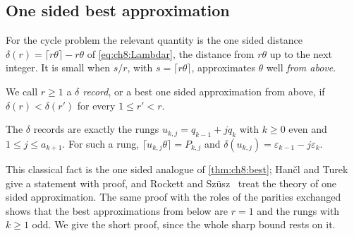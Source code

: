 \subsection{One sided best approximation}

For the cycle problem the relevant quantity is the one sided distance
$\delta(r)=\lceil r\theta\rceil-r\theta$ of \eqref{eq:ch8:Lambdar}, the
distance from $r\theta$ up to the next integer. It is small when $s/r$, with
$s=\lceil r\theta\rceil$, approximates $\theta$ well \emph{from above}.

\begin{definition}\label{def:ch8:records}
We call $r\geq1$ a \emph{$\delta$ record}, or a best one sided approximation
from above, if $\delta(r)<\delta(r')$ for every $1\leq r'<r$.
\end{definition}

\begin{theorem}\label{thm:ch8:onesided}
The $\delta$ records are exactly the rungs $u_{k,j}=q_{k-1}+jq_k$ with $k\geq0$
even and $1\leq j\leq a_{k+1}$. For such a rung,
$\lceil u_{k,j}\theta\rceil=P_{k,j}$ and
$\delta(u_{k,j})=\varepsilon_{k-1}-j\varepsilon_k$.
\end{theorem}

This classical fact is the one sided analogue of \cref{thm:ch8:best}; Han\v{c}l and Turek~\cite[Theorem~4.5(ii)]{hancl2019} give a statement with proof, and
Rockett and Sz\"usz~\cite{rockett1992} treat the theory of one sided
approximation. The same proof with the roles of the parities exchanged shows
that the best approximations from below are $r=1$ and the rungs with $k\geq1$ odd. We give
the short proof, since the whole sharp bound rests on it.

